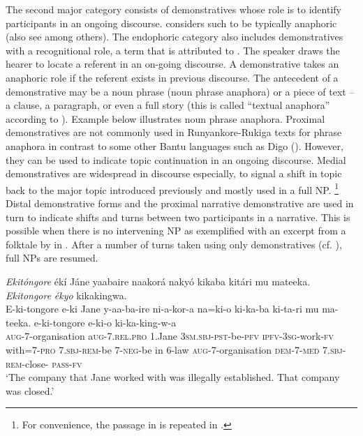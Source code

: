 \documentclass[output=paper 		  ]{langscibook}
\begin{document}
The second major category consists of demonstratives whose role is to identify participants in an ongoing discourse. \citet{Diessel1999} considers such to be typically anaphoric (also see \citealt{Himmelmann1996, Lyons1999, Levinson2004, Guillemin2011} among others). The endophoric category also includes demonstratives with a recognitional role, a term that is attributed to \citet{Himmelmann1996}. The speaker draws the hearer to locate a referent in an on-going discourse. A demonstrative takes an anaphoric role if the referent exists in previous discourse. The antecedent of a demonstrative may be a noun phrase (noun phrase anaphora) or a piece of text -- a clause, a paragraph, or even a full story (this is called ``textual anaphora'' according to \citet[64]{Dixon2003}). Example  below illustrates noun phrase anaphora. Proximal demonstratives are not commonly used in Run\-yan\-ko\-re-Ru\-ki\-ga texts for phrase anaphora in contrast to some other Bantu languages such as Digo (\citealt{Nicolle2007,Nicolle2014}). However, they can be used to indicate topic continuation in an ongoing discourse. Medial demonstratives are widespread in discourse especially, to signal a shift in topic  back to the major topic introduced previously and mostly used in a full NP. \footnote{For convenience, the passage in  is repeated in .} Distal demonstrative forms and the proximal narrative demonstrative are used in turn to indicate shifts and turns between two participants in a narrative. This is possible when there is no intervening NP as exemplified with an excerpt from a folktale by \citet[56--57]{Mubangizi1966} in . After a number of turns taken using only demonstratives (cf. ), full NPs are resumed.

\eanoraggedright%
    \label{ex:asiimwe:50}
    \emph{Ekitóngore} ékí Jáne yaabaire naakorá nakyó kikaba kitári mu mateeka. \emph{Ekitongore} \emph{ékyo} kikakingwa.\\
\gll E-ki-tongore  e-ki  Jane  y-aa-ba-ire  ni-a-kor-a   na=ki-o  ki-ka-ba  ki-ta-ri  mu  ma-teeka.  e-ki-tongore e-ki-o  ki-ka-king-w-a\\
\textsc{aug}{}-7-organisation  a\textsc{ug}{}-7.\textsc{rel.pro}  1.Jane  \textsc{3sm}.\textsc{sbj-pst}{}-be-\textsc{pfv}  \textsc{ipfv}{}-3\textsc{sg}{}-work-\textsc{fv}
with=7-\textsc{pro}  7.\textsc{sbj-rem}{}-be  7-\textsc{neg}{}-be  in  6-law \textsc{aug}{}-7-organisation
\textsc{dem}{}-7-\textsc{med}  7.\textsc{sbj}{}-\textsc{rem}{}-close- \textsc{pass-fv}\\
  \glt ‘The company that Jane worked with was illegally established. That company was closed.’
\end{document}
